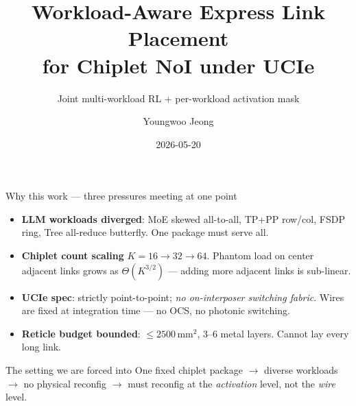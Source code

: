 \documentclass[aspectratio=169]{beamer}
\title{Workload-Aware Express Link Placement\\for Chiplet NoI under UCIe}
\subtitle{Joint multi-workload RL + per-workload activation mask}
\author{Youngwoo Jeong}
\institute{MangoBoost}
\date{2026-05-20}
\begin{document}
\maketitle

\begin{frame}{Why this work — three pressures meeting at one point}
\begin{itemize}
  \item \textbf{LLM workloads diverged}: MoE skewed all-to-all,
        TP+PP row/col, FSDP ring, Tree all-reduce butterfly.
        \alert{One package must serve all.}
  \item \textbf{Chiplet count scaling} $K{=}16\!\to\!32\!\to\!64$. Phantom load
        on center adjacent links grows as $\Theta(K^{3/2})$
        --- adding more adjacent links is sub-linear.
  \item \textbf{UCIe spec}: strictly point-to-point;
        \emph{no on-interposer switching fabric}.
        Wires are fixed at integration time --- no OCS, no photonic switching.
  \item \textbf{Reticle budget bounded}: $\le 2500\,\text{mm}^2$,
        3--6 metal layers. Cannot lay every long link.
\end{itemize}
\vspace{0.3em}
\begin{block}{The setting we are forced into}
One fixed chiplet package $\rightarrow$ diverse workloads $\rightarrow$
no physical reconfig $\rightarrow$ \alert{must reconfig at the
\emph{activation} level, not the \emph{wire} level}.
\end{block}
\end{frame}
\end{document}
